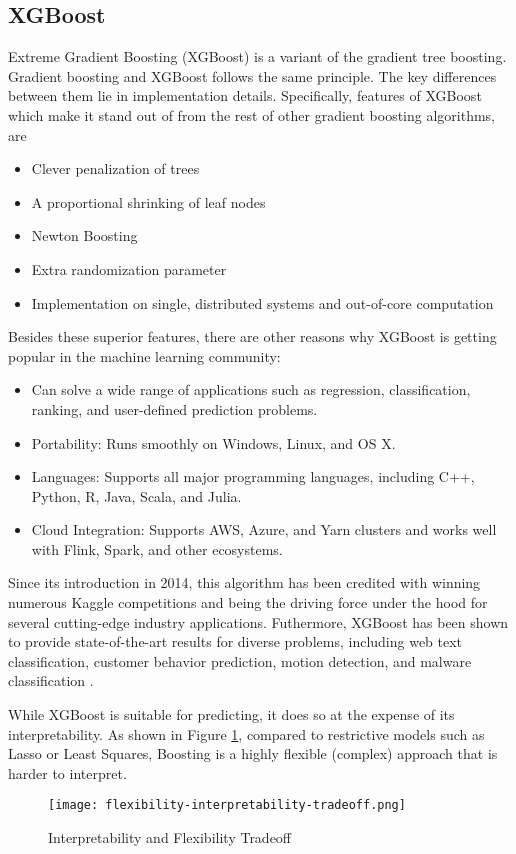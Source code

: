 \subsection{XGBoost}
Extreme Gradient Boosting (XGBoost) is a variant of the gradient tree boosting.
Gradient boosting and XGBoost follows the same principle. The key differences
between them lie in implementation details.
Specifically, features of XGBoost which make it stand out of from the rest of
other gradient boosting algorithms, are
\begin{itemize}
    \item Clever penalization of trees
    \item A proportional shrinking of leaf nodes
    \item Newton Boosting
    \item Extra randomization parameter
    \item Implementation on single, distributed systems and out-of-core computation
\end{itemize}
Besides these superior features, there are other reasons why XGBoost is getting
popular in the machine learning community:
\begin{itemize}
    \item Can solve a wide range of applications such as regression,
        classification, ranking, and user-defined prediction problems.
    \item Portability: Runs smoothly on Windows, Linux, and OS X.
    \item Languages: Supports all major programming languages, including C++,
        Python, R, Java, Scala, and Julia.
    \item Cloud Integration: Supports AWS, Azure, and Yarn clusters and works
        well with Flink, Spark, and other ecosystems.
\end{itemize}

Since its introduction in 2014, this algorithm has
been credited with winning numerous Kaggle competitions and being the driving
force under the hood for several cutting-edge industry applications. Futhermore,
XGBoost has been shown to provide state-of-the-art results for diverse problems,
including web text classification, customer behavior prediction, motion
detection, and malware classification \textcite{chen2016xgboost}
\textcite{nielsen2016tree}.

While XGBoost is suitable for predicting, it does so at the expense of its
interpretability.  As shown in Figure
\ref{fig:flexibility-interpretability-tradeoff}, compared to restrictive models
such as Lasso or Least Squares, Boosting is a highly flexible (complex) approach
that is harder to interpret.

\begin{figure}[H]\centering
    \texttt{[image: flexibility-interpretability-tradeoff.png]}
    \caption{Interpretability and Flexibility Tradeoff}
    \label{fig:flexibility-interpretability-tradeoff}
\end{figure}
